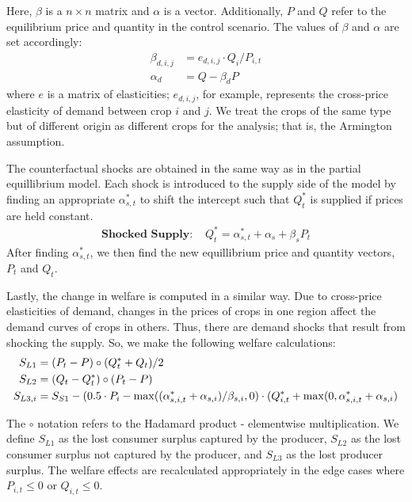 \documentclass[12pt]{article}
\begin{document}
Here, $\beta$ is a $n \times n$ matrix and $\alpha$ is a vector. Additionally, $P$ and $Q$ refer to the equilibrium price and quantity in the control scenario. The values of $\beta$ and $\alpha$ are set accordingly:
\begin{align*}
\beta_{d, i, j}  &= e_{d, i, j} \cdot Q_{i} / P_{i, t} \\
\alpha_{d} &= Q - \beta_{d} P
\end{align*}
where $e$ is a matrix of elasticities; $e_{d, i, j}$, for example, represents the cross-price elasticity of demand between crop $i$ and $j$. We treat the crops of the same type but of different origin as different crops for the analysis; that is, the Armington assumption. 

The counterfactual shocks are obtained in the same way as in the partial equillibrium model. Each shock is introduced to the supply side of the model by finding an appropriate $\alpha_{s, t}^*$ to shift the intercept such that $Q_{t}^*$ is supplied if prices are held constant.
\begin{subequations}
	\begin{align}
	\textbf{Shocked Supply: } & Q_{t}^* = \alpha_{s, t}^* + \alpha_{s} + \beta_{s} P_{t}
	\end{align}
\end{subequations}	
After finding $\alpha_{s, t}^*$, we then find the new equillibrium price and quantity vectors, $P_t$ and $Q_t$. 

Lastly, the change in welfare is computed in a similar way. Due to cross-price elasticities of demand, changes in the prices of crops in one region affect the demand curves of crops in others. Thus, there are demand shocks that result from shocking the supply. So, we make the following welfare calculations:
\begin{align*}
S_{L1} &= (P_t - P) \circ (Q^*_t + Q_t) / 2 \\
S_{L2} &= (Q_t - Q_t^*) \circ (P_t - P) \\
S_{L3, i} &= S_{S1} - (0.5\cdot P_i - \max(\-(\alpha_{s, i, t}^* + \alpha_{s, i})/\beta_{s, i}, 0) \cdot (Q_{i, t}^* + \max(0, \alpha_{s, i, t}^* + \alpha_{s, i})
\end{align*}

The $\circ$ notation refers to the Hadamard product - elementwise multiplication. We define $S_{L1}$ as the lost consumer surplus captured by the producer, $S_{L2}$ as the lost consumer surplus not captured by the producer, and $S_{L3}$ as the lost producer surplus. The welfare effects are recalculated appropriately in the edge cases where $P_{i, t} \leq 0$ or $Q_{i, t} \leq 0$. 
\end{document}
